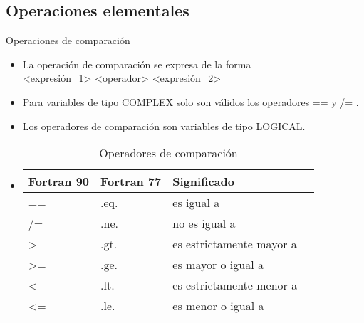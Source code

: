 
\subsection{Operaciones elementales}


\begin{frame}[fragile]{Operaciones de comparación}  
 \begin{itemize}[<+(0)->]
  \item La operación de comparación se expresa de la forma \\
      \centering <expresión\_1> <operador> <expresión\_2>
  \item Para variables de tipo COMPLEX solo son válidos los operadores == y /= .
  \item Los operadores de comparación son variables de tipo LOGICAL.
    \vspace{0.4cm}
  \item []
    \begin{table}[]
    \centering
    \label{Tabla_comparacion}
    \begin{tabular}{|l|l|l|l|}
    \hline
    Fortran 90  & Fortran 77    & Significado                  \\ \hline
    ==          & .eq.          & es igual a                   \\ \hline
    /=          & .ne.          & no es igual a                \\ \hline
    >           & .gt.          & es estrictamente mayor a     \\ \hline
    >=          & .ge.          & es mayor o igual a           \\ \hline
    <           & .lt.          & es estrictamente menor a     \\ \hline
    <=          & .le.          & es menor o igual a           \\ \hline              
    \end{tabular}
    \caption*{Operadores de comparación}
    \end{table}
 \end{itemize}
\end{frame}


